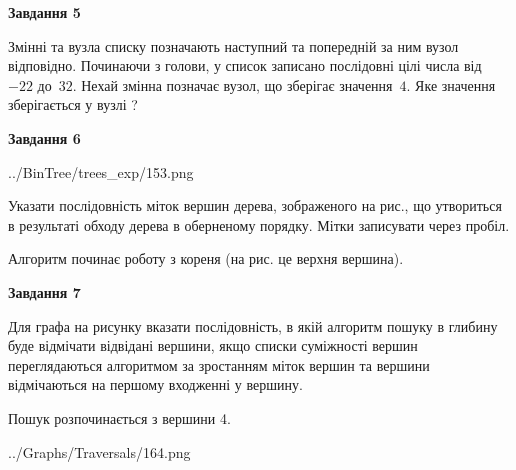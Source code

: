 \documentclass[12pt, ukrainian]{article}
\begin{document}
{\begin {large}
{\begin {center}\textbf{Завдання 5}\end {center}}\par
Змінні  та  вузла списку позначають наступний та попередній за ним вузол відповідно. Починаючи з голови, у список записано послідовні цілі числа від~$-22$ до~$32$. Нехай змінна  позначає вузол, що зберігає значення~$4$.
Яке значення зберігається у вузлі  ?\par
\newpage

{\begin {center}\textbf{Завдання 6}\end {center}}\par

\begin{center}
	{../BinTree/trees_exp/153.png}
\end{center}
Указати послідовність міток вершин дерева, зображеного на рис., що утвориться в результаті обходу дерева в оберненому порядку. Мітки записувати через пробіл.\par Алгоритм починає роботу з кореня (на рис. це верхня вершина).\par
\newpage

{\begin {center}\textbf{Завдання 7}\end {center}}\par
Для графа на рисунку вказати послідовність, в якій алгоритм пошуку в глибину буде відмічати відвідані вершини, якщо списки суміжності вершин переглядаються алгоритмом за зростанням міток вершин та вершини відмічаються на першому вход\-женні у вершину.\par
Пошук розпочинається з вершини 4.\par

\begin{center}
	{../Graphs/Traversals/164.png}
\end{center}\par
\newpage


\end{large}}
\end{document}
